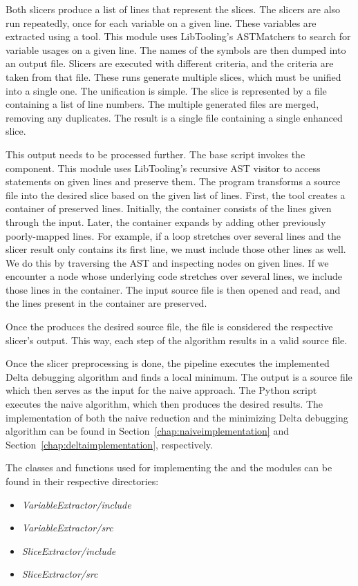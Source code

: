 Both slicers produce a list of lines that represent the slices. 
The slicers are also run repeatedly, once for each variable on a given line. 
These variables are extracted using a  tool. 
This module uses LibTooling's ASTMatchers to search for variable usages on 
a given line. 
The names of the symbols are then dumped into an output file. 
Slicers are executed with different criteria, and the criteria are taken 
from that file.
These runs generate multiple slices, which must be unified into a single one. 
The unification is simple. 
The slice is represented by a file containing a list of line numbers. 
The multiple generated files are merged, removing any duplicates. 
The result is a single file containing a single enhanced slice. 

This output needs to be processed further. 
The base script invokes the  component. 
This module uses LibTooling's recursive AST visitor to access statements on 
given lines and preserve them. 
The program transforms a source file into the desired slice based on 
the given list of lines. 
First, the tool creates a container of preserved lines. 
Initially, the container consists of the lines given through the input. 
Later, the container expands by adding other previously poorly-mapped lines. 
For example, if a  loop stretches over several lines and 
the slicer result only contains its first line, we must include those other 
lines as well. 
We do this by traversing the AST and inspecting nodes on given lines. 
If we encounter a node whose underlying code stretches over several lines, 
we include those lines in the container. 
The input source file is then opened and read, and the lines present in 
the container are preserved. 

Once the  produces the desired source file, the file 
is considered the respective slicer's output.
This way, each step of the algorithm results in a valid source file.

Once the slicer preprocessing is done, the pipeline executes the implemented 
Delta debugging algorithm and finds a local minimum. 
The output is a source file which then serves as the input for the naive 
approach.
The Python script executes the naive algorithm, which then produces the 
desired results.
The implementation of both the naive reduction and the minimizing Delta 
debugging algorithm can be found in Section~\ref{chap:naiveimplementation} 
and Section~\ref{chap:deltaimplementation}, respectively.

The classes and functions used for implementing 
the  and the  modules can be 
found in their respective directories:
\begin{itemize}
  \item \emph{VariableExtractor/include}
  \item \emph{VariableExtractor/src}
  \item \emph{SliceExtractor/include}
  \item \emph{SliceExtractor/src}
\end{itemize}